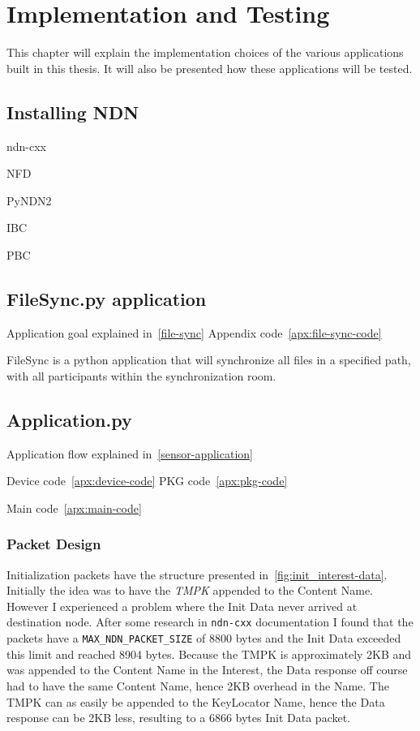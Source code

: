 \chapter{Implementation and Testing}
This chapter will explain the implementation choices of the various applications built in this thesis. 
It will also be presented how these applications will be tested.

\section{Installing NDN}

\gls{ndn-cxx}

\gls{NFD}

\gls{PyNDN2}

\gls{IBC}~\cite{charm13}

\gls{PBC}~\cite{ben2007implementation}


\section{FileSync.py application}
Application goal explained in~\autoref{file-sync}
Appendix code~\autoref{apx:file-sync-code}

FileSync is a python application that will synchronize all files in a specified path, with all participants within the synchronization room.

\section{Application.py}
Application flow explained in~\autoref{sensor-application}

Device code~\autoref{apx:device-code}
\gls{PKG} code~\autoref{apx:pkg-code}

Main code~\autoref{apx:main-code}

\subsection{Packet Design}
Initialization packets have the structure presented in~\autoref{fig:init_interest-data}.
Initially the idea was to have the \textit{\gls{TMPK}} appended to the Content Name. 
However I experienced a problem where the Init Data never arrived at destination node. 
After some research in \texttt{ndn-cxx} documentation I found that the packets have a \texttt{MAX\_NDN\_PACKET\_SIZE} of 8800 bytes and the Init Data exceeded this limit and reached 8904 bytes.
Because the \gls{TMPK} is approximately 2\gls{KB} and was appended to the Content Name in the Interest, the Data response off course had to have the same Content Name, hence 2\gls{KB} overhead in the Name. 
The \gls{TMPK} can as easily be appended to the KeyLocator Name, hence the Data response can be 2\gls{KB} less, resulting to a 6866 bytes Init Data packet.


